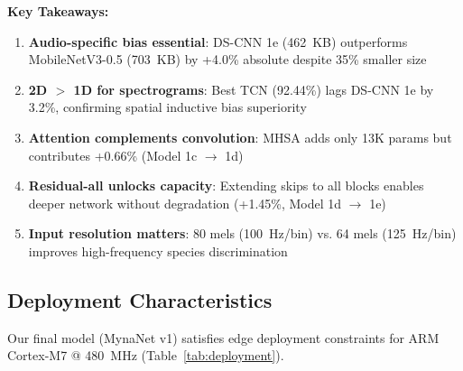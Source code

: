 \documentclass[conference]{IEEEtran}
\begin{document}
\noindent\textbf{Key Takeaways:}
\begin{enumerate}
    \item \textbf{Audio-specific bias essential}: DS-CNN 1e (462~KB) outperforms MobileNetV3-0.5 (703~KB) by +4.0\% absolute despite 35\% smaller size
    \item \textbf{2D $>$ 1D for spectrograms}: Best TCN (92.44\%) lags DS-CNN 1e by 3.2\%, confirming spatial inductive bias superiority
    \item \textbf{Attention complements convolution}: MHSA adds only 13K params but contributes +0.66\% (Model 1c $\to$ 1d)
    \item \textbf{Residual-all unlocks capacity}: Extending skips to all blocks enables deeper network without degradation (+1.45\%, Model 1d $\to$ 1e)
    \item \textbf{Input resolution matters}: 80 mels (100~Hz/bin) vs. 64 mels (125~Hz/bin) improves high-frequency species discrimination
\end{enumerate}

\subsection{Deployment Characteristics}
\label{sec:deployment}

Our final model (MynaNet v1) satisfies edge deployment constraints for ARM Cortex-M7 @ 480~MHz (Table~\ref{tab:deployment}).
\end{document}
